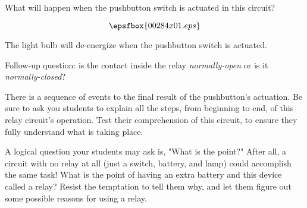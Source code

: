 

What will happen when the pushbutton switch is actuated in this circuit?

$$\epsfbox{00284x01.eps}$$







The light bulb will de-energize when the pushbutton switch is actuated.

\vskip 10pt

Follow-up question: is the contact inside the relay {\it normally-open} or is it {\it normally-closed}?







There is a sequence of events to the final result of the pushbutton's actuation.  Be sure to ask you students to explain all the steps, from beginning to end, of this relay circuit's operation.  Test their comprehension of this circuit, to ensure they fully understand what is taking place.

A logical question your students may ask is, "What is the point?"  After all, a circuit with no relay at all (just a switch, battery, and lamp) could accomplish the same task!  What is the point of having an extra battery and this device called a relay?  Resist the temptation to tell them why, and let them figure out some possible reasons for using a relay.




